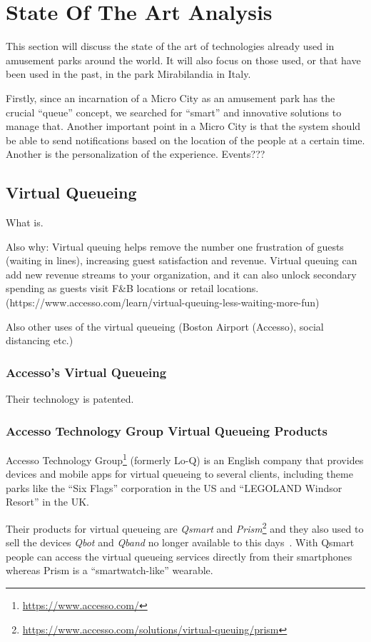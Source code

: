 \section{State Of The Art Analysis}\label{sec:state-of-the-art-analysis}
This section will discuss the state of the art of technologies already used in amusement parks around the world.
It will also focus on those used, or that have been used in the past, in the park Mirabilandia in Italy.

Firstly, since an incarnation of a Micro City as an amusement park has the crucial ``queue'' concept, we searched for ``smart''
and innovative solutions to manage that.
Another important point in a Micro City is that the system should be able to send notifications based on the location of
the people at a certain time.
Another is the personalization of the experience.
Events???

\subsection{Virtual Queueing}\label{subsec:virtual-queueing}
What is.

Also why: Virtual queuing helps remove the number one frustration of guests (waiting in lines), increasing guest
satisfaction and revenue.
Virtual queuing can add new revenue streams to your organization, and it can also unlock
secondary spending as guests visit F\&B locations or retail locations.
(https://www.accesso.com/learn/virtual-queuing-less-waiting-more-fun)

Also other uses of the virtual queueing (Boston Airport (Accesso), social distancing etc.)
\subsubsection{Accesso's Virtual Queueing}
Their technology is patented.

\subsubsection{Accesso Technology Group Virtual Queueing Products}
Accesso Technology Group\footnote{\url{https://www.accesso.com/}} (formerly Lo-Q) is an English company that provides
devices and mobile apps for virtual queueing to several clients, including theme parks like the ``Six Flags'' corporation in the US
and ``LEGOLAND Windsor Resort'' in the UK\@.

Their products for virtual queueing are \textit{Qsmart} and \textit{Prism}\footnote{\url{https://www.accesso.com/solutions/virtual-queuing/prism}}
and they also used to sell the devices \textit{Qbot} and \textit{Qband} no longer available to this days~\cite{accesso-wikipedia}.
With Qsmart people can access the virtual queueing services directly from their smartphones whereas Prism is a ``smartwatch-like''
wearable.

